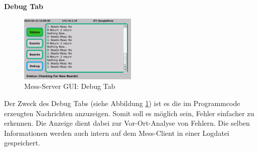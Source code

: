 \textbf{Debug Tab}

\begin{figure}[H]
\begin{center}
\includegraphics[width=0.5\textwidth ]{img/GUI/Server_GUI_Debug2.png}
\caption{Mess-Server GUI: Debug Tab}
\label{figure_MessServerGUIDebug}
\end{center}
\end{figure}

Der Zweck des Debug Tabs (siehe Abbildung \ref{figure_MessServerGUIDebug}) ist es die im Programmcode erzeugten Nachrichten anzuzeigen. Somit soll es möglich sein, Fehler einfacher zu erkennen. Die Anzeige dient dabei zur Vor-Ort-Analyse von Fehlern. Die selben Informationen werden auch intern auf dem Mess-Client in einer Logdatei gespeichert.


